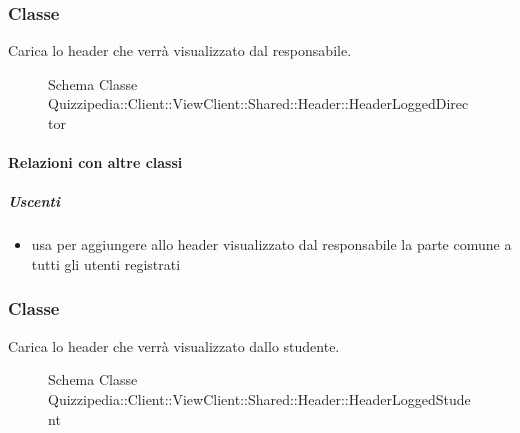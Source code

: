 \subsubsection{Classe }
Carica lo header che verrà visualizzato dal responsabile.
\begin{figure}[H]
\centering
\noindent{}
\caption[Schema Classe HeaderLoggedDirector]{Schema Classe Quizzipedia::Client::ViewClient::Shared::Header::HeaderLoggedDirector}
\end{figure}
\paragraph{Relazioni con altre classi}
\subparagraph{Uscenti}
\begin{itemize}
\item usa  per aggiungere allo header visualizzato dal responsabile la parte comune a tutti gli utenti registrati
\end{itemize}
\subsubsection{Classe }
Carica lo header che verrà visualizzato dallo studente.
\begin{figure}[H]
\centering
\noindent{}
\caption[Schema Classe HeaderLoggedStudent]{Schema Classe Quizzipedia::Client::ViewClient::Shared::Header::HeaderLoggedStudent}
\end{figure}
